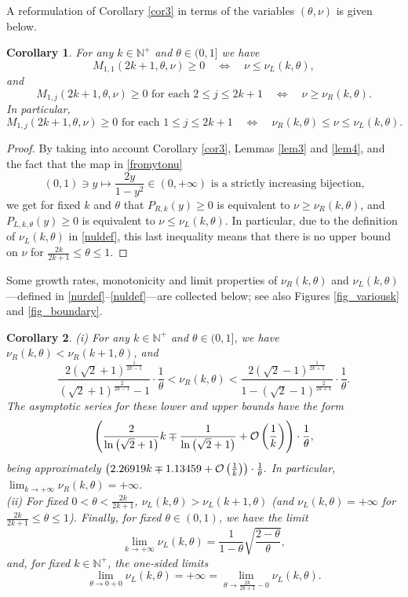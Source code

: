 \documentclass[a4paper]{article}
\newtheorem{corollary}{Corollary}
\newcommand{\te}{\theta}
\newcommand{\nul}{\nu_L(k,\theta)}
\newcommand{\nur}{\nu_R(k,\theta)}
\newcommand{\nplus}{\mathbb{N}^+}
\newcommand{\Por}{P_{R,k}(y)}
\newcommand{\Pol}{P_{L,k,\te}(y)}
\begin{document}
A reformulation of Corollary \ref{cor3} in terms of the variables $(\te,\nu)$ is given below.
\begin{corollary}\label{cor4}
For any $k\in\nplus$ and $\te\in(0,1]$ we have 
\[
M_{1,1}(2k+1,\te,\nu)\ge 0 \quad \Longleftrightarrow \quad \nu\le\nul,
\] 
and
\[
M_{1,j}(2k+1,\te,\nu)\ge 0 \text{  for each } 2\le j\le 2k+1 \quad \Longleftrightarrow \quad \nu\ge\nur.
\] 
In particular, 
\[
M_{1,j}(2k+1,\te,\nu)\ge 0 \text{  for each } 1\le j\le 2k+1  \quad \Longleftrightarrow \quad \nur\le\nu\le\nul.
\] 
\end{corollary}
\begin{proof} By taking into account Corollary \ref{cor3}, Lemmas \ref{lem3} and \ref{lem4}, and the fact that the map in \eqref{fromytonu} 
\begin{equation}\label{cor4bijection}
(0,1)\ni y\mapsto\frac{2y}{1-y^2}\in(0,+\infty)\text{ is a strictly increasing bijection,}
\end{equation}
we get for fixed $k$ and $\te$ that $\Por\ge 0$ is equivalent to $\nu\ge\nur$, and
$\Pol\ge 0$ is equivalent to $\nu\le\nul$. In particular, due to the definition of $\nul$ in \eqref{nuldef}, this last inequality means that there is no upper bound on $\nu$ for $\frac{2k}{2k+1}\le \te\le 1$.
\end{proof}
Some growth rates, monotonicity and limit properties of $\nur$ and $\nul$---defined in 
\eqref{nurdef}--\eqref{nuldef}---are collected below; 
see also Figures \ref{fig_variousk} and \ref{fig_boundary}.
\begin{corollary}\label{cor5} (i) For any $k\in\nplus$ and $\te\in(0,1]$, we have $\nur<\nu_R(k+1,\theta)$, and
\begin{equation}\label{cor5lowerupper}
\frac{2 \left(\sqrt{2}+1\right)^{\frac{1}{2 k-1}}}{\left(\sqrt{2}+1\right)^{\frac{2}{2
   k-1}}-1}\cdot\frac{1}{\te}<\nur<\frac{2 \left(\sqrt{2}-1\right)^{\frac{1}{2 k+1}}}{1-\left(\sqrt{2}-1\right)^{\frac{2}{2
   k+1}}}\cdot\frac{1}{\te}.
\end{equation}
The asymptotic series for these lower and upper bounds have the form
\[
\left( \frac{2}{\ln \left(\sqrt{2}+1\right)}k\mp\frac{1}{\ln \left(\sqrt{2}+1\right)}+ {\cal{O}}\left(\frac{1}{k}\right)\right)\cdot\frac{1}{\te},
\]
being approximately
$
\left( 2.26919 k\mp1.13459+ {\cal{O}}\left(\frac{1}{k}\right)\right)\cdot\frac{1}{\te}.
$
In particular, $\lim_{k\to+\infty} \nur=+\infty$.\\
(ii) For fixed $0<\te<\frac{2k}{2k+1}$, $\nul>\nu_L(k+1,\theta)$ (and $\nul =+\infty$ for $\frac{2k}{2k+1}\le\te\le 1$). Finally, for fixed $\te\in(0,1)$, we have the limit
\begin{equation}\label{cor5klim}
\lim_{k\to+\infty} \nul=\frac{1}{1-\theta }\sqrt{\frac{2-\theta }{\theta }},
\end{equation}
and, for fixed $k\in\nplus$, the one-sided limits  
\begin{equation}\label{cor5thetalim}
\lim_{\te\to 0+0} \nul=+\infty=\lim_{\te\to\frac{2k}{2k+1}-0} \nul.
\end{equation}
\end{corollary}
\end{document}
